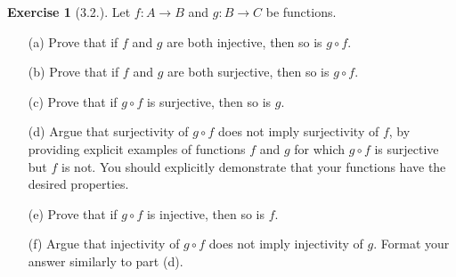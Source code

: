 \documentclass[9pt,reqno]{amsart}
\theoremstyle{definition}
\newtheorem{exercise}{Exercise}[section]
\begin{document}
\begin{exercise}[3.2.] Let $f \colon A \to B$ and $g \colon B \to C$ be functions.
\begin{itemize}
	\item[(a)] Prove that if $f$ and $g$ are both injective, then so is $g \circ f$.
	\item[(b)] Prove that if $f$ and $g$ are both surjective, then so is $g \circ f$.
	\item[(c)] Prove that if $g \circ f$ is surjective, then so is $g$. 
	\item[(d)] Argue that surjectivity of $g \circ f$ does not imply surjectivity of $f$, by providing explicit examples of functions $f$ and $g$ for which $g \circ f$ is surjective but $f$ is not. You should explicitly demonstrate that your functions have the desired properties. 
	\item[(e)] Prove that if $g \circ f$ is injective, then so is $f$. 
	\item[(f)] Argue that injectivity of $g \circ f$ does not imply injectivity of $g$. Format your answer similarly to part (d).

\end{itemize}
\end{exercise}
\end{document}
